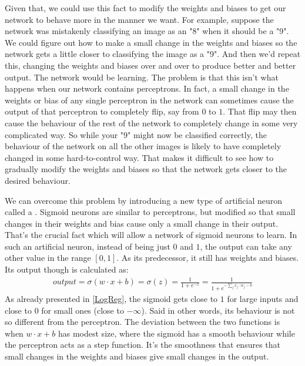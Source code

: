 Given that, we could use this fact to modify the weights and biases to get our network to behave more in the manner we want. For example, suppose the network was mistakenly classifying an image as an "8" when it should be a "9". We could figure out how to make a small change in the weights and biases so the network gets a little closer to classifying the image as a "9". And then we'd repeat this, changing the weights and biases over and over to produce better and better output. The network would be learning. The problem is that this isn't what happens when our network contains perceptrons. In fact, a small change in the weights or bias of any single perceptron in the network can sometimes cause the output of that perceptron to completely flip, say from $0$ to $1$. That flip may then cause the behaviour of the rest of the network to completely change in some very complicated way. So while your "9" might now be classified correctly, the behaviour of the network on all the other images is likely to have completely changed in some hard-to-control way. That makes it difficult to see how to gradually modify the weights and biases so that the network gets closer to the desired behaviour.

We can overcome this problem by introducing a new type of artificial neuron called a . Sigmoid neurons are similar to perceptrons, but modified so that small changes in their weights and bias cause only a small change in their output. That's the crucial fact which will allow a network of sigmoid neurons to learn. In such an artificial neuron, instead of being just $0$ and $1$, the output can take any other value in the range $[0,1]$. As its predecessor, it still has weights and biases. Its output though is calculated as:
\begin{equation}
\begin{aligned}
\textit{output} = \sigma(w\cdot x+b) = \sigma(z) = \frac{1}{1+e^{-z}} = \frac{1}{1+e^{-\sum_j x_j \cdot w_j -b}} 
\end{aligned}
\end{equation}
As already presented in \autoref{LogReg}, the sigmoid gets close to $1$ for large inputs and close to $0$ for small ones (close to $-\infty$). Said in other words, its behaviour is not so different from the perceptron. The deviation between the two functions is when $w\cdot x +b$ has modest size, where the sigmoid has a smooth behaviour while the perceptron acts as a step function. It's the smoothness that ensures that small changes in the weights and biases give small changes in the output.

